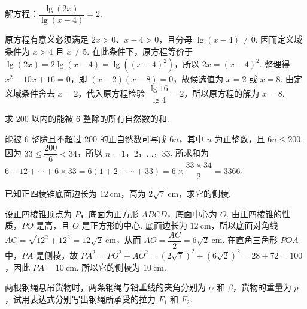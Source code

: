 \begin{problem}
解方程：\(\dfrac{\lg(2x)}{\lg(x-4)}=2\).
\end{problem}

\begin{solution}
原方程有意义必须满足 \(2x>0\)、\(x-4>0\)，且分母 \(\lg(x-4)\neq0\). 因而定义域条件为 \(x>4\) 且 \(x\neq5\). 在此条件下，原方程等价于
\(\lg(2x)=2\lg(x-4)=\lg\left((x-4)^2\right)\)，所以 \(2x=(x-4)^2\). 整理得 \(x^2-10x+16=0\)，即 \((x-2)(x-8)=0\)，故候选值为 \(x=2\) 或 \(x=8\). 由定义域条件舍去 \(x=2\)，代入原方程检验 \(\dfrac{\lg16}{\lg4}=2\)，所以原方程的解为 \(x=8\).
\end{solution}

\begin{problem}
求 \(200\) 以内的能被 \(6\) 整除的所有自然数的和.
\end{problem}

\begin{solution}
能被 \(6\) 整除且不超过 \(200\) 的正自然数可写成 \(6n\)，其中 \(n\) 为正整数，且 \(6n\leqslant200\). 因为 \(33\leqslant\dfrac{200}{6}<34\)，所以 \(n=1\)，\(2\)，\(\ldots\)，\(33\). 所求和为
\(6+12+\cdots+6\times33=6(1+2+\cdots+33)=6\times\dfrac{33\times34}{2}=3366\).
\end{solution}

\begin{problem}
已知正四棱锥底面边长为 \(12\mathrm{~cm}\)，高为 \(2\sqrt7\mathrm{~cm}\)，求它的侧棱.
\end{problem}

\begin{solution}
设正四棱锥顶点为 \(P\)，底面为正方形 \(ABCD\)，底面中心为 \(O\). 由正四棱锥的性质，\(PO\) 是高，且 \(O\) 是正方形的中心. 底面边长为 \(12\mathrm{~cm}\)，所以底面对角线 \(AC=\sqrt{12^2+12^2}=12\sqrt2\mathrm{~cm}\)，从而 \(AO=\dfrac{AC}{2}=6\sqrt2\mathrm{~cm}\). 在直角三角形 \(POA\) 中，\(PA\) 是侧棱，故
\(PA^2=PO^2+AO^2=(2\sqrt7)^2+(6\sqrt2)^2=28+72=100\)，因此 \(PA=10\mathrm{~cm}\). 所以它的侧棱为 \(10\mathrm{~cm}\).
\end{solution}

\begin{problem}
两根钢绳悬吊货物时，两条钢绳与铅垂线的夹角分别为 \(\alpha\) 和 \(\beta\)，货物的重量为 \(p\)，试用表达式分别写出钢绳所承受的拉力 \(F_1\) 和 \(F_2\).
\end{problem}

